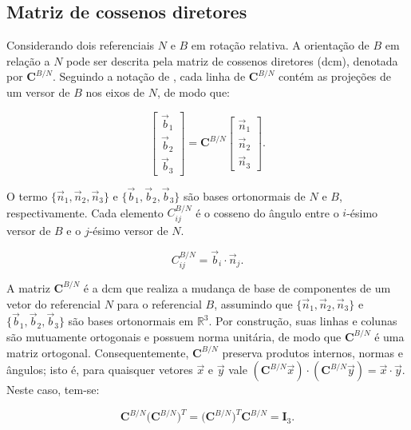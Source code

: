 \subsection{Matriz de cossenos diretores}
\label{sec:matriz_cosseno_diretor}

Considerando dois referenciais $N$ e $B$ em rotação relativa.
A orientação de $B$ em relação a $N$ pode ser descrita pela matriz de cossenos diretores (\gls{dcm}), denotada por $\mathbf{C}^{B/N}$.
Seguindo a notação de \cite{wie2008space}, cada linha de $\mathbf{C}^{B/N}$ contém as projeções de um versor de $B$ nos eixos de $N$, de modo que:

\begin{equation}
\begin{bmatrix}
\vec{b}_1 \\
\vec{b}_2 \\
\vec{b}_3
\end{bmatrix}
=
\mathbf{C}^{B/N}
\begin{bmatrix}
\vec{n}_1 \\
\vec{n}_2 \\
\vec{n}_3
\end{bmatrix}.
\label{eq:def_dcm_ba}
\end{equation}

O termo $\{\vec{n}_1,\vec{n}_2,\vec{n}_3\}$ e $\{\vec{b}_1,\vec{b}_2,\vec{b}_3\}$ são bases ortonormais de $N$ e $B$, respectivamente.
Cada elemento $C_{ij}^{B/N}$ é o cosseno do ângulo entre o $i$-ésimo versor de $B$ e o $j$-ésimo versor de $N$.

\begin{equation}
C_{ij}^{B/N} = \vec{b}_i \cdot \vec{n}_j.
\end{equation}

A matriz $\mathbf{C}^{B/N}$ é a \gls{dcm} que realiza a mudança de base de componentes de um vetor do referencial $N$ para o referencial $B$, assumindo que $\{\vec{n}_1,\vec{n}_2,\vec{n}_3\}$ e $\{\vec{b}_1,\vec{b}_2,\vec{b}_3\}$ são bases ortonormais em $\mathbb{R}^3$.
Por construção, suas linhas e colunas são mutuamente ortogonais e possuem norma unitária, de modo que $\mathbf{C}^{B/N}$ é uma matriz ortogonal.
Consequentemente, $\mathbf{C}^{B/N}$ preserva produtos internos, normas e ângulos; isto é, para quaisquer vetores $\vec{x}$ e $\vec{y}$ vale $(\mathbf{C}^{B/N}\vec{x})\cdot(\mathbf{C}^{B/N}\vec{y})=\vec{x}\cdot\vec{y}$.
Neste caso, tem-se:

\begin{equation}
\mathbf{C}^{B/N}\big(\mathbf{C}^{B/N}\big)^{T}
=
\big(\mathbf{C}^{B/N}\big)^{T}\mathbf{C}^{B/N}
=
\mathbf{I}_3.
\label{eq:ortonormalidade_C}
\end{equation}


